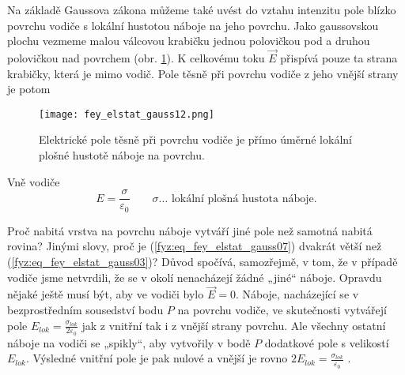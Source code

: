       Na základě Gaussova zákona můžeme také uvést do vztahu intenzitu pole blízko povrchu vodiče s lokální 
      hustotou náboje na jeho povrchu. Jako gaussovskou plochu vezmeme malou válcovou krabičku jednou 
      polovičkou pod a druhou polovičkou nad povrchem (obr. \ref{fyz:fig_fey_elstat_gauss12}). K celkovému 
      toku \(\vec{E}\) přispívá pouze ta strana krabičky, která je mimo vodič. Pole těsně při povrchu vodiče 
      z jeho vnější strany je potom
      \begin{figure}[ht!] %
        \centering
        \texttt{[image: fey\_elstat\_gauss12.png]}
        \caption{Elektrické pole těsně při povrchu vodiče je přímo úměrné lokální plošné hustotě náboje na 
                 povrchu.}
        \label{fyz:fig_fey_elstat_gauss12}
      \end{figure} 
      Vně vodiče
      \begin{equation}\label{fyz:eq_fey_elstat_gauss07}
        E = \frac{\sigma}{\varepsilon_0}  \qquad\text{\(\sigma\ldots\) lokální plošná hustota náboje}.
      \end{equation}
      
      Proč nabitá vrstva na povrchu náboje vytváří jiné pole než samotná nabitá rovina? Jinými slovy, proč je 
      (\ref{fyz:eq_fey_elstat_gauss07}) dvakrát větší než (\ref{fyz:eq_fey_elstat_gauss03})? Důvod spočívá, 
      samozřejmě, v tom, že v případě vodiče jsme netvrdili, že se v okolí nenacházejí žádné „jiné“ náboje. 
      Opravdu nějaké ještě musí být, aby ve vodiči bylo \(\vec{E} = 0\). Náboje, nacházející se v 
      bezprostředním sousedství bodu \(P\) na povrchu vodiče, ve skutečnosti vytvářejí pole 
      \(E_{lok}=\frac{\sigma_{lok}}{2\varepsilon_0}\) jak z vnitřní tak i z vnější strany povrchu. Ale všechny
      ostatní náboje na vodiči se „spikly“, aby vytvořily v bodě \(P\) dodatkové pole s velikostí 
      \(E_{lok}\). Výsledné vnitřní pole je pak nulové a vnější je rovno \(2E_{lok} = 
      \frac{\sigma_{lok}}{\varepsilon_0}\) \cite[s.~93]{Feynman02}.
      
